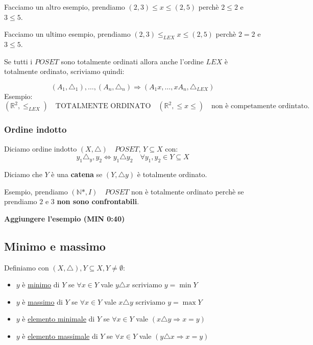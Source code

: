 \documentclass{article}
\theoremstyle{definition}
\begin{document}
Facciamo un altro esempio, prendiamo $(2,3) \le x \le(2,5)$ perchè $2 \le 2$ e $3 \le 5$. \par
Facciamo un ultimo esempio, prendiamo $(2,3) \le_{LEX} x \le(2,5)$ perchè $2 = 2$ e $3 \le 5$. \newline

Se tutti i $POSET$ sono totalmente ordinati allora anche l'ordine $LEX$ è totalmente ordinato, scriviamo quindi:

\begin{equation*}
        (A_1,\triangle_1), \ldots, (A_n, \triangle_n) \Rightarrow (A_1x,\ldots,xA_n,\triangle_{LEX})
\end{equation*}
Esempio:
\begin{equation*}
        (\mathbb{R}^2, \le_{LEX}) \quad \mbox{TOTALMENTE ORDINATO} \quad (\mathbb{R}^2, \le x \le) \quad \mbox{non è competamente ordintato}. 
\end{equation*}


\subsubsection{Ordine indotto}
Diciamo ordine indotto $(X, \triangle) \quad POSET$, $ Y \subseteq X$ con:
\begin{equation*}
        y_1 \triangle_y,y_2 \Leftrightarrow y_1 \triangle y_2 \quad \forall y_1,y_2 \in Y \subseteq X
\end{equation*}

Diciamo che $Y$ è una \textbf{catena} se $(Y, \triangle y)$ è totalmente ordinato. \par

Esempio, prendiamo $(\mathbb{N}*, I) \quad POSET$ non è totalmente ordinato perchè se prendiamo $2$ e $3$ \textbf{non sono confrontabili}. \par
\textbf{Aggiungere l'esempio (MIN 0:40)}



\subsection{Minimo e massimo}
Definiamo con $(X, \triangle), Y \subseteq X, Y \not = \emptyset$:
\begin{itemize}
        \item $y$ è \underline{minimo} di $Y$ se $\forall x \in Y$  vale $y \triangle x$ scriviamo $y = \min Y$
        \item $y$ è \underline{massimo} di $Y$ se $\forall x \in Y$  vale $x \triangle y$ scriviamo $y = \max Y$
        \item $y$ è \underline{elemento minimale} di $Y$ se $\forall x \in Y$  vale $(x \triangle y \Rightarrow x = y)$
        \item $y$ è \underline{elemento massimale} di $Y$ se $\forall x \in Y$  vale $(y \triangle x \Rightarrow x = y)$
\end{itemize}
\end{document}

